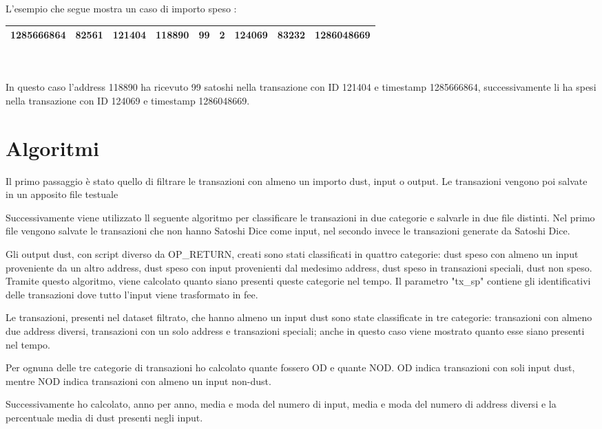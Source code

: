 L'esempio che segue mostra un caso di importo speso :\\
\begin{tabular}{|r|r|r|r|r|r|r|r|r|}
\toprule
1285666864 &    82561 & 121404 &  118890 &      99 &           2 &       124069 &       83232 &      1286048669\\
\bottomrule
\end{tabular}\\\\
In questo caso l'address 118890 ha ricevuto 99 satoshi nella transazione con ID 121404 e timestamp 1285666864, successivamente li ha spesi nella transazione con ID 124069 e timestamp 1286048669.\\
\section{Algoritmi}
Il primo passaggio è stato quello di filtrare le transazioni con almeno un importo dust, input o output. Le transazioni vengono poi salvate in un apposito file testuale  

Successivamente viene utilizzato ll seguente algoritmo per classificare le transazioni in due categorie e salvarle in due file distinti.
Nel primo file vengono salvate le transazioni che non hanno Satoshi Dice come input, nel secondo invece le transazioni generate da Satoshi Dice.

Gli output dust, con script diverso da OP\_RETURN, creati sono stati classificati in quattro categorie: dust speso con almeno un input proveniente da un altro address, dust speso con input provenienti dal medesimo address, dust speso in transazioni speciali, dust non speso. Tramite questo algoritmo, viene calcolato quanto siano presenti queste categorie nel tempo. Il parametro "tx\_sp" contiene gli identificativi delle transazioni dove tutto l'input viene trasformato in fee.

Le transazioni, presenti nel dataset filtrato, che hanno almeno un input dust sono state classificate in tre categorie: transazioni con almeno due address diversi, transazioni con un solo address e transazioni speciali; anche in questo caso viene mostrato quanto esse siano presenti nel tempo.

Per ognuna delle tre categorie di transazioni ho calcolato quante fossero OD e quante NOD. OD indica transazioni con soli input dust, mentre NOD indica transazioni con almeno un input non-dust.

Successivamente ho calcolato, anno per anno, media e moda del numero di input, media e moda del numero di address diversi e la percentuale media di dust presenti negli input.
